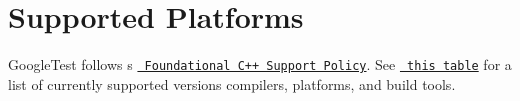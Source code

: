 \chapter{Supported Platforms}
\hypertarget{md_googletest_2docs_2platforms}{}\label{md_googletest_2docs_2platforms}
Google\+Test follows \textquotesingle{}s \href{https://opensource.google/documentation/policies/cplusplus-support}{\texttt{ Foundational C++ Support Policy}}. See \href{https://github.com/google/oss-policies-info/blob/main/foundational-cxx-support-matrix.md}{\texttt{ this table}} for a list of currently supported versions compilers, platforms, and build tools. 